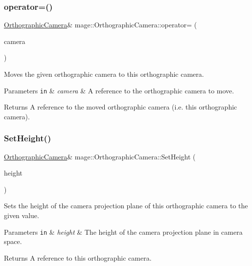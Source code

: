 \subsubsection{\texorpdfstring{operator=()}{operator=()}\hspace{0.1cm}{\footnotesize\ttfamily [2/2]}}
{\footnotesize\ttfamily \hyperlink{classmage_1_1_orthographic_camera}{Orthographic\+Camera}\& mage\+::\+Orthographic\+Camera\+::operator= (\begin{DoxyParamCaption}\item[{\hyperlink{classmage_1_1_orthographic_camera}{Orthographic\+Camera} \&\&}]{camera }\end{DoxyParamCaption})\hspace{0.3cm}{\ttfamily [default]}}

Moves the given orthographic camera to this orthographic camera.


\begin{DoxyParams}[1]{Parameters}
\mbox{\tt in}  & {\em camera} & A reference to the orthographic camera to move. \\
\hline
\end{DoxyParams}
\begin{DoxyReturn}{Returns}
A reference to the moved orthographic camera (i.\+e. this orthographic camera). 
\end{DoxyReturn}
\hypertarget{classmage_1_1_orthographic_camera_a57cb23f7bee15791f6a73a1244815614}{}\label{classmage_1_1_orthographic_camera_a57cb23f7bee15791f6a73a1244815614} 
\subsubsection{\texorpdfstring{Set\+Height()}{SetHeight()}}
{\footnotesize\ttfamily \hyperlink{classmage_1_1_orthographic_camera}{Orthographic\+Camera}\& mage\+::\+Orthographic\+Camera\+::\+Set\+Height (\begin{DoxyParamCaption}\item[{float}]{height }\end{DoxyParamCaption})}

Sets the height of the camera projection plane of this orthographic camera to the given value.


\begin{DoxyParams}[1]{Parameters}
\mbox{\tt in}  & {\em height} & The height of the camera projection plane in camera space. \\
\hline
\end{DoxyParams}
\begin{DoxyReturn}{Returns}
A reference to this orthographic camera. 
\end{DoxyReturn}
\hypertarget{classmage_1_1_orthographic_camera_a10e09af47e741ab76dc2aa2a03f04c06}{}\label{classmage_1_1_orthographic_camera_a10e09af47e741ab76dc2aa2a03f04c06} 
